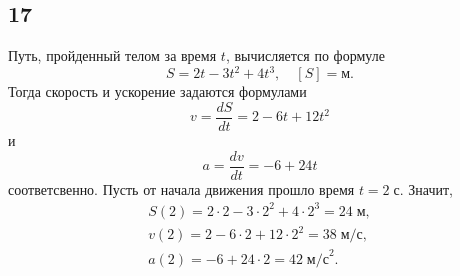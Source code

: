 \subsection{17}

Путь, пройденный телом за время $t$, вычисляется по формуле
\[
S=2t-3t^2+4t^3,\quad[S]=\text{м}.
\]
Тогда скорость и ускорение задаются формулами
\[
v=\frac{dS}{dt}=2-6t+12t^2
\]
и
\[
a=\frac{dv}{dt}=-6+24t
\]
соответсвенно. Пусть от начала движения прошло время $t=2\;\text{с}$. Значит,
\begin{gather*}
S(2)=2\cdot2-3\cdot2^2+4\cdot2^3=24\;\text{м}, \\
v(2)=2-6\cdot2+12\cdot2^2=38\;\text{м/с}, \\
a(2)=-6+24\cdot2=42\;\text{м/с}^2.
\end{gather*}